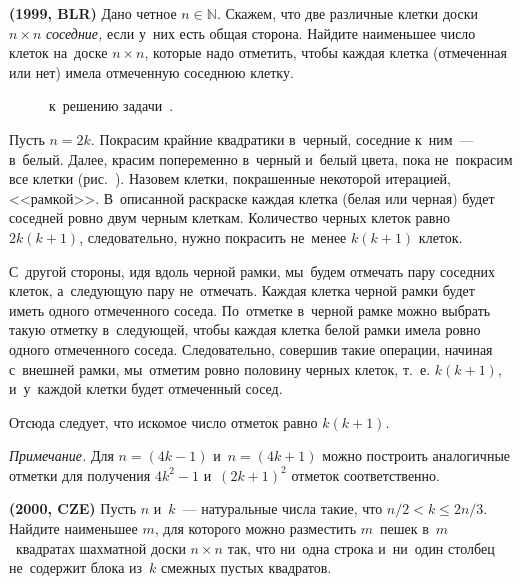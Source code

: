 \begin{problems}

\item\textbf{(1999, BLR)}
Дано четное $n \in \mathbb{N}$.
Скажем, что две различные клетки доски $n \times n$ \emph{соседние,} если у~них
есть общая сторона.
Найдите наименьшее число клеток на~доске $n \times n$, которые надо отметить,
чтобы каждая клетка (отмеченная или нет) имела отмеченную соседнюю клетку.

\end{problems}

\ifincludesolutions
\begin{figure}[ht]\begin{center}
\caption{к~решению
    задачи~.}%
%
\end{center}\end{figure}
Пусть $n = 2 k$.
Покрасим крайние квадратики в~черный, соседние к~ним~--- в~белый.
Далее, красим попеременно в~черный и~белый цвета, пока не~покрасим все клетки 
(рис.~).
Назовем клетки, покрашенные некоторой итерацией, <<рамкой>>.
В~описанной раскраске каждая клетка (белая или черная) будет соседней ровно
двум черным клеткам.
Количество черных клеток равно $2 k (k + 1)$, следовательно, нужно покрасить
не~менее $k (k + 1)$ клеток.
\par
С~другой стороны, идя вдоль черной рамки, мы~будем отмечать пару соседних
клеток, а~следующую пару не~отмечать.
Каждая клетка черной рамки будет иметь одного отмеченного соседа.
По~отметке в~черной рамке можно выбрать такую отметку в~следующей, чтобы каждая
клетка белой рамки имела ровно одного отмеченного соседа.
Следовательно, совершив такие операции, начиная с~внешней рамки, мы~отметим
ровно половину черных клеток, т.~е. $k (k + 1)$, и~у~каждой клетки будет
отмеченный сосед.
\par
Отсюда следует, что искомое число отметок равно $k (k + 1)$.
\par
\emph{Примечание.}
Для $n = (4 k - 1)$ и~$n = (4 k + 1)$ можно построить аналогичные отметки для
получения $4 k^2 - 1$ и~$(2 k + 1)^2$ отметок соответственно.
\fi %

\begin{problems}

\item\textbf{(2000, CZE)}%
Пусть $n$ и~$k$~--- натуральные числа такие, что $n / 2 < k \leq 2 n / 3$.
Найдите наименьшее $m$, для которого можно разместить $m$~пешек в~$m$~квадратах
шахматной доски $n \times n$ так, что ни~одна строка и~ни~один столбец
не~содержит блока из~$k$ смежных пустых квадратов.

\end{problems}


